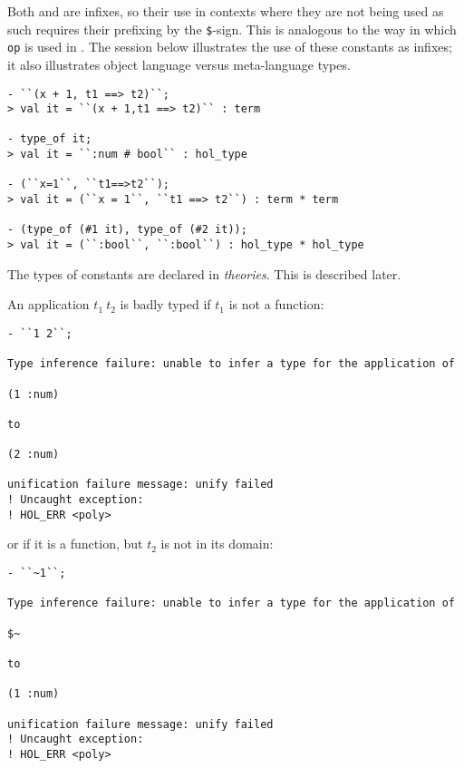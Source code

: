 \noindent Both \ml{+} and \ml{==>} are infixes, so their use in
contexts where they are not being used as such requires their
prefixing by the \texttt{\$}-sign.  This is analogous to the way in
which \texttt{op} is used in \ML. The session below illustrates the
use of these constants as infixes; it also illustrates object language
versus meta-language types.

\begin{session}\begin{verbatim}
- ``(x + 1, t1 ==> t2)``;
> val it = ``(x + 1,t1 ==> t2)`` : term

- type_of it;
> val it = ``:num # bool`` : hol_type

- (``x=1``, ``t1==>t2``);
> val it = (``x = 1``, ``t1 ==> t2``) : term * term

- (type_of (#1 it), type_of (#2 it));
> val it = (``:bool``, ``:bool``) : hol_type * hol_type
\end{verbatim}\end{session}

\noindent The types of constants are declared in {\it theories}.  This is
described later.

An application $t_1\ t_2$ is badly typed if $t_1$ is not a function:

\begin{session}\begin{verbatim}
- ``1 2``;

Type inference failure: unable to infer a type for the application of

(1 :num)

to

(2 :num)

unification failure message: unify failed
! Uncaught exception:
! HOL_ERR <poly>
\end{verbatim}\end{session}

\noindent or if it is a function, but $t_2$ is not in its domain:

\begin{session}\begin{verbatim}
- ``~1``;

Type inference failure: unable to infer a type for the application of

$~

to

(1 :num)

unification failure message: unify failed
! Uncaught exception:
! HOL_ERR <poly>
\end{verbatim}\end{session}

